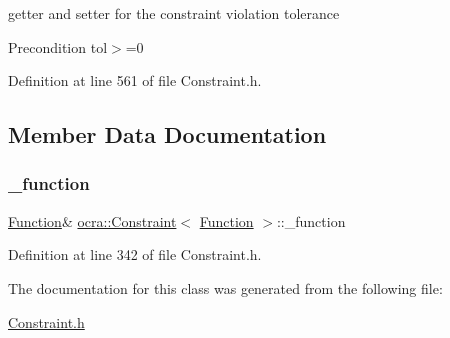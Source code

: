 getter and setter for the constraint violation tolerance

\begin{DoxyPrecond}{Precondition}
tol$>$=0 
\end{DoxyPrecond}


Definition at line 561 of file Constraint.\+h.



\subsection{Member Data Documentation}
\hypertarget{classocra_1_1Constraint_3_01Function_01_4_a51f8ef2f03da02c092aff7db27b325b6}{}\label{classocra_1_1Constraint_3_01Function_01_4_a51f8ef2f03da02c092aff7db27b325b6} 
\subsubsection{\texorpdfstring{\+\_\+function}{\_function}}
{\footnotesize\ttfamily \hyperlink{classocra_1_1Function}{Function}\& \hyperlink{classocra_1_1Constraint}{ocra\+::\+Constraint}$<$ \hyperlink{classocra_1_1Function}{Function} $>$\+::\+\_\+function\hspace{0.3cm}{\ttfamily [protected]}}



Definition at line 342 of file Constraint.\+h.



The documentation for this class was generated from the following file\+:\begin{DoxyCompactItemize}
\item 
\hyperlink{Constraint_8h}{Constraint.\+h}\end{DoxyCompactItemize}
